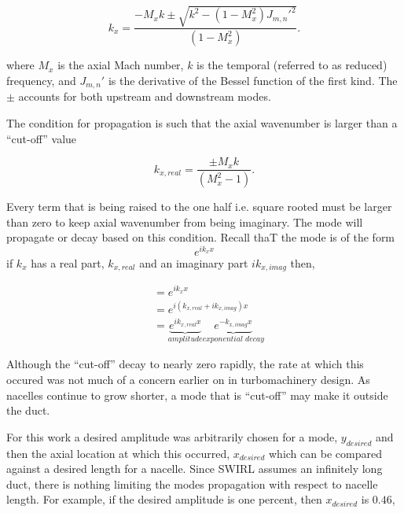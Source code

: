 \documentclass[a4paper]{report}
\begin{document}
\begin{equation}
    k_x  = \frac{- M_x k \pm \sqrt{k^2 - ( 1 - M_x^2) J_{m,n}'^2 }}{\left( 1 - M_x^2 \right)}.
    \label{eqn:ax_wavenumb}
\end{equation}

where $M_x$ is the axial Mach number, $k$ is the temporal (referred to as reduced)
frequency, and $J_{m,n}'$ is the derivative of the Bessel function of the first kind.  
The $\pm$ accounts for both upstream and downstream modes.

The condition for propagation is such that the axial wavenumber is larger than 
a ``cut-off'' value

\begin{equation}
    k_{x,real}  = \frac{\pm M_x k }{\left( M_x^2 - 1 \right)}.
    \label{eqn:cuton}
\end{equation}

Every term that is being raised to the one half i.e. square rooted must 
be larger than zero to keep axial wavenumber from being imaginary. The mode 
will propagate or decay based on this condition. Recall thaT the mode is of the 
form 
\begin{equation}
    e^{i k_x x}
    \label{eqn:fluctuationexample}
\end{equation}
if $k_x$ has a real part, $k_{x,real}$ and an imaginary part $i k_{x,imag}$ 
then,

\begin{align}
    &= e^{i k_x x} \\
    &= e^{i (k_{x,real}+ i k_{x,imag}) x} \\
    &= \underbrace{e^{i k_{x,real}x}}_{\textit{amplitude}} \underbrace{e^{- k_{x,imag} x}}_{\textit{exponential decay}} 
\end{align}

Although the ``cut-off'' decay to nearly zero rapidly, the rate at which this occured
was not much of a concern earlier on in turbomachinery design. As nacelles 
continue to grow shorter, a mode that is ``cut-off'' may make it outside the duct.

For this work a desired amplitude was arbitrarily chosen for a mode, $y_{desired}$
and then the axial location at which this occurred, $x_{desired}$ which 
can be compared against a desired length for a nacelle.  
Since SWIRL assumes an infinitely long duct, there is nothing limiting the 
modes propagation with respect to nacelle length. For example, if the 
desired amplitude is one percent, then $x_{desired}$ is $0.46$, 
\end{document}
